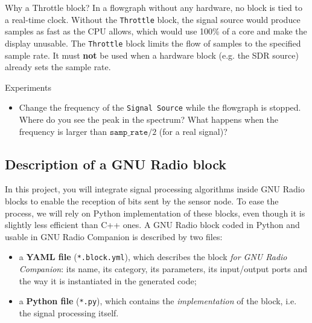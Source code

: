 \begin{bclogo}[couleur = gray!20, arrondi = 0.2, logo=\bcattention]{Why a Throttle block?}
In a flowgraph without any hardware, no block is tied to a real-time clock. Without the \texttt{Throttle} block, the signal source would produce samples as fast as the CPU allows, which would use 100\% of a core and make the display unusable. The \texttt{Throttle} block limits the flow of samples to the specified sample rate. It must \textbf{not} be used when a hardware block (e.g. the SDR source) already sets the sample rate.
\end{bclogo}

\begin{bclogo}[couleur = gray!20, arrondi = 0.2, logo=\bcquestion]{Experiments}
\begin{itemize}
    \item Change the frequency of the \texttt{Signal Source} while the flowgraph is stopped. Where do you see the peak in the spectrum? What happens when the frequency is larger than $\texttt{samp\_rate}/2$ (for a real signal)?
\end{itemize}
\end{bclogo}

\subsection{Description of a GNU Radio block}

In this project, you will integrate signal processing algorithms inside GNU Radio blocks to enable the reception of bits sent by the sensor node. To ease the process, we will rely on Python implementation of these blocks, even though it is slightly less efficient than C++ ones. A GNU Radio block coded in Python and usable in GNU Radio Companion is described by two files:
\begin{itemize}
    \item a \textbf{YAML file} (\texttt{*.block.yml}), which describes the block \emph{for GNU Radio Companion}: its name, its category, its parameters, its input/output ports and the way it is instantiated in the generated code;
    \item a \textbf{Python file} (\texttt{*.py}), which contains the \emph{implementation} of the block, i.e. the signal processing itself.
\end{itemize}

